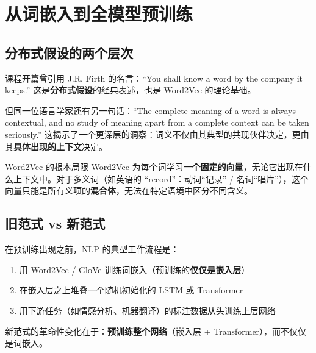 \documentclass[a4paper]{article}
\begin{document}

\section{从词嵌入到全模型预训练}

\subsection{分布式假设的两个层次}

课程开篇曾引用 J.R. Firth 的名言：``You shall know a word by the company it keeps.'' 这是\textbf{分布式假设}的经典表述，也是 Word2Vec 的理论基础。

但同一位语言学家还有另一句话：``The complete meaning of a word is always contextual, and no study of meaning apart from a complete context can be taken seriously.'' 这揭示了一个更深层的洞察：词义不仅由其典型的共现伙伴决定，更由其\textbf{具体出现的上下文}决定。





\begin{importantbox}{Word2Vec 的根本局限}
Word2Vec 为每个词学习\textbf{一个固定的向量}，无论它出现在什么上下文中。对于多义词（如英语的 ``record''：动词``记录'' / 名词``唱片''），这个向量只能是所有义项的\textbf{混合体}，无法在特定语境中区分不同含义。
\end{importantbox}

\subsection{旧范式 vs 新范式}

在预训练出现之前，NLP 的典型工作流程是：

\begin{enumerate}
    \item 用 Word2Vec / GloVe 训练词嵌入（预训练的\textbf{仅仅是嵌入层}）
    \item 在嵌入层之上堆叠一个随机初始化的 LSTM 或 Transformer
    \item 用下游任务（如情感分析、机器翻译）的标注数据从头训练上层网络
\end{enumerate}

新范式的革命性变化在于：\textbf{预训练整个网络}（嵌入层 + Transformer），而不仅仅是词嵌入。


\end{document}

